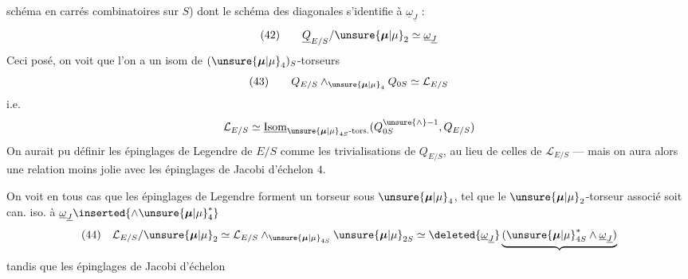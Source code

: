 
schéma en carrés combinatoires sur $S$) dont le schéma des diagonales s'identifie à $\underline{\omega}_{\underline{J}}$ :
\[
(42)\qquad \underline{Q}_{E/S}/\unsure{\boldsymbol{\mu}|\mu}_2\simeq\underline{\omega}_{\underline{J}}
\]
Ceci posé, on voit que l'on a un isom de $(\unsure{\boldsymbol{\mu}|\mu}_4)_S$-torseurs
\[
(43)\qquad Q_{E/S}\wedge_{\unsure{\boldsymbol{\mu}|\mu}_4}Q_{0S}\simeq\mathcal{L}_{E/S}
\]
i.e.
\[
\mathcal{L}_{E/S}\simeq\underline{\operatorname{Isom}}_{\unsure{\boldsymbol{\mu}|\mu}_{4S}\text{-tors.}}(Q_{0S}^{\unsure{\wedge}-1},Q_{E/S})
\]
On aurait pu définir les épinglages de Legendre de $E/S$ comme les trivialisations de $Q_{E/S}$, au lieu de celles de $\mathcal{L}_{E/S}$ --- mais on aura alors une relation moins jolie avec les épinglages de Jacobi d'échelon $4$.

On voit en tous cas que les épinglages de Legendre forment un torseur sous $\unsure{\boldsymbol{\mu}|\mu}_4$, tel que le $\unsure{\boldsymbol{\mu}|\mu}_2$-torseur associé soit can. iso. à $\underline{\omega}_{\underline{J}}\inserted{\wedge\unsure{\boldsymbol{\mu}|\mu}_4^*}$
\[
(44)\quad\mathcal{L}_{E/S}/\unsure{\boldsymbol{\mu}|\mu}_2\simeq\mathcal{L}_{E/S}\wedge_{\unsure{\boldsymbol{\mu}|\mu}_{4S}}\unsure{\boldsymbol{\mu}|\mu}_{2S}\simeq\deleted{\underline{\omega}_{\underline{J}}}\underbrace{(\unsure{\boldsymbol{\mu}|\mu}_{4S}^*\wedge\underline{\omega}_{\underline{J}})}
\]
tandis que les épinglages de Jacobi d'échelon
